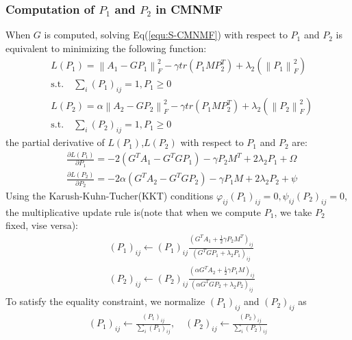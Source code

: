 \documentclass{bmcart}
\begin{document}
\subsubsection*{Computation of $P_1$ and $P_2$ in CMNMF}
When $G$ is computed, solving Eq(\ref{equ:S-CMNMF}) with respect to $P_1$  and $P_2$ is equivalent to minimizing the following function:
\begin{equation}\label{equ:obj_P1}\nonumber
\begin{split}
&L(P_{1})=\left\| {{A_1} - GP_1} \right\|_F^2 - \gamma tr({P_1}MP_2^T)+{\lambda _2}(\left\| {{P_1}} \right\|_F^2 )\\
   &\mathrm{s.t. }\quad \sum_i (P_1)_{ij}=1,P_1\ge 0\\
&L(P_{2})=\alpha\left\|A_2 - GP_2\right\|_F^2 - \gamma tr(P_1MP_2^T)+{\lambda _2}(\left\|P_2\right\|_F^2 )\\
   &\mathrm{s.t. }\quad \sum_i (P_2)_{ij}=1,P_1\ge 0
\end{split}
\end{equation}
the partial derivative of $L(P_1)$,$L(P_2)$ with respect to $P_1$ and $P_2$ are:
\begin{equation}\label{equ:P1_gradient}\nonumber
\begin{split}
&\frac{\partial{L(P_1)}}{\partial{P_1}}=
-2(G^TA_1-{G^TGP_1})-\gamma P_2M^T +2\lambda_2P_1+\Omega\\
&\frac{\partial{L(P_2)}}{\partial{P_2}}=
-2\alpha(G^TA_2-{G^TGP_2})-\gamma P_1M +2\lambda_2P_2+\psi
\end{split}
\end{equation}
Using the Karush-Kuhn-Tucher(KKT) conditions
 $\varphi_{ij}(P_1)_{ij}=0 , \psi_{ij}(P_2)_{ij}=0$, the multiplicative update rule is(note that when we compute $P_1$, we take $P_2$ fixed, vise versa):
\begin{equation}\label{updating_P}\nonumber
\begin{split}
&(P_1)_{ij}\leftarrow (P_1)_{ij}
\frac{(G^TA_1+\frac{1}{2}\gamma P_2M^T)_{ij}}
{(G^TGP_1+\lambda_2P_1)_{ij}}\\
&(P_2)_{ij}\leftarrow (P_2)_{ij}
\frac{(\alpha G^TA_2+\frac{1}{2}\gamma P_1M)_{ij}}
{(\alpha G^TGP_2 + \lambda_2P_2)_{ij}}
\end{split}
\end{equation}
To satisfy the equality constraint, we normalize $(P_1)_{ij}$ and $(P_2)_{ij}$ as
\begin{equation}\label{equ:updating_P2}\nonumber
\begin{split}
(P_1)_{ij}\leftarrow \frac{(P_1)_{ij}}{\sum_{i}(P_1)_{ij}}, \quad
(P_2)_{ij}\leftarrow \frac{(P_2)_{ij}}{\sum_{i}(P_2)_{ij}}
\end{split}
\end{equation}
\end{document}
